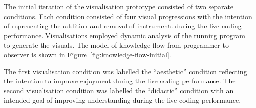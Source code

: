 The initial iteration of the visualisation prototype consisted of two separate conditions. Each condition consisted of four visual progressions with the intention of representing the addition and removal of instruments during the live coding performance. Visualisations employed dynamic analysis of the running program to generate the visuals. The model of knowledge flow from programmer to observer is shown in Figure~\ref{fig:knowledge-flow-initial}.

The first visualisation condition was labelled the ``aesthetic'' condition reflecting the intention to improve enjoyment during the live coding performance. The second visualisation condition was labelled the ``didactic'' condition with an intended goal of improving understanding during the live coding performance.






